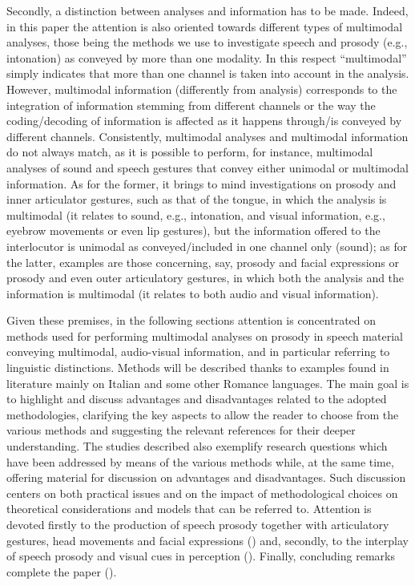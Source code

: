 \documentclass[output=paper]{langsci/langscibook}
\begin{document}
Secondly, a distinction between analyses and information has to be made. Indeed, in this paper the attention is also oriented towards different types of multimodal analyses, those being the methods we use to investigate speech and prosody (e.g., intonation) as conveyed by more than one modality. In this respect ``multimodal'' simply indicates that more than one channel is taken into account in the analysis. However, multimodal information (differently from analysis) corresponds to the integration of information stemming from different channels or the way the coding\slash decoding of information is affected as it happens through\slash is conveyed by different channels. Consistently, multimodal analyses and multimodal information do not always match, as it is possible to perform, for instance, multimodal analyses of sound and speech gestures that convey either unimodal or multimodal information. As for the former, it brings to mind investigations on prosody and inner articulator gestures, such as that of the tongue, in which the analysis is multimodal (it relates to sound, e.g., intonation, and visual information, e.g., eyebrow movements or even lip gestures), but the information offered to the interlocutor is unimodal as conveyed\slash included in one channel only (sound); as for the latter, examples are those concerning, say, prosody and facial expressions or prosody and even outer articulatory gestures, in which both the analysis and the information is multimodal (it relates to both audio and visual information).

Given these premises, in the following sections attention is concentrated on methods used for performing multimodal analyses on prosody in speech material conveying multimodal, audio-visual information, and in particular referring to linguistic distinctions. Methods will be described thanks to examples found in literature mainly on Italian and some other Romance languages. The main goal is to highlight and discuss advantages and disadvantages related to the adopted methodologies, clarifying the key aspects to allow the reader to choose from the various methods and suggesting the relevant references for their deeper understanding. The studies described also exemplify research questions which have been addressed by means of the various methods while, at the same time, offering material for discussion on advantages and disadvantages. Such discussion centers on both practical issues and on the impact of methodological choices on theoretical considerations and models that can be referred to. Attention is devoted firstly to the production of speech prosody together with articulatory gestures, head movements and facial expressions () and, secondly, to the interplay of speech prosody and visual cues in perception (). Finally, concluding remarks complete the paper ().
\end{document}
